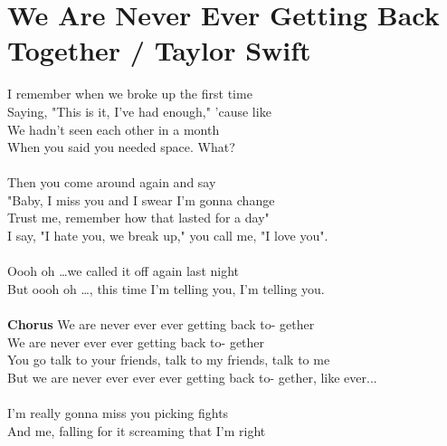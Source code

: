 \section{We Are Never Ever Getting Back Together / Taylor Swift}\label{sec:weareneverevergettingbacktogether}

  \Cmajor
  \Gmajor
  \DmajorEasy
  \EminorSeven
  
  
 I remember when we broke  up the first time\\
 Saying, "This is it, I've had  enough," 'cause like\\
 We hadn't seen each other in a  month\\
When you  said you needed  space. What?\\
 \\
 Then you come around again and  say\\
"Baby, I  miss you and I swear I'm gonna  change\\
Trust me,  remember how that lasted for a  day"\\
I say, "I  hate you, we break up," you  call me, "I love you".\\
 \\
 Oooh  oh …we  called it off  again last night\\
But  oooh  oh …, this  time I'm  telling you, I'm telling you.\\
 \\
\textbf{Chorus}  We are  never ever  ever getting back to- gether\\
 We are  never ever  ever getting  back to- gether\\
 You go talk to  your friends, talk to my  friends, talk to  me \\
But  we are  never ever  ever ever  getting back to- gether,  like  ever...\\
\\
I'm  really gonna miss you picking  fights\\
And me,  falling for it screaming that I'm  right\\
